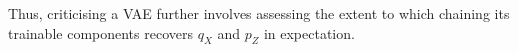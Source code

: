 Thus, criticising a VAE further involves \enumthree assessing the extent to which %
chaining its trainable components recovers $q_X$ and $p_Z$ in expectation.







